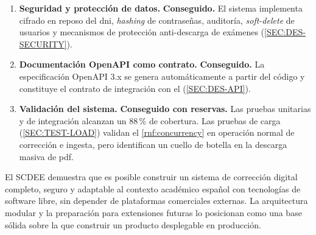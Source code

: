 \begin{enumerate}
  \item \textbf{Seguridad y protección de datos.}
  \label{OBJ:SECURITY-RGPD}
  \textbf{Conseguido.} El sistema implementa cifrado en reposo del
  \acs{dni}, \textit{hashing} de contraseñas, auditoría,
  \textit{soft-delete} de usuarios y mecanismos de protección
  anti-descarga de exámenes (\cref{SEC:DES-SECURITY}).

  \item \textbf{Documentación OpenAPI como contrato.}
  \label{OBJ:OPENAPI-CONTRACT}
  \textbf{Conseguido.} La especificación OpenAPI 3.x se genera
  automáticamente a partir del código y constituye el contrato de
  integración con el  (\cref{SEC:DES-API}).

  \item \textbf{Validación del sistema.}
  \label{OBJ:VALIDATION}
  \textbf{Conseguido con reservas.} Las pruebas unitarias y de
  integración alcanzan un 88\,\% de cobertura. Las pruebas de carga
  (\cref{SEC:TEST-LOAD}) validan el \cref{rnf:concurrency} en operación
  normal de corrección e ingesta, pero identifican un cuello de botella
  en la descarga masiva de \acs{pdf}.

\end{enumerate}

El SCDEE demuestra que es posible construir un sistema de corrección
digital completo, seguro y adaptable al contexto académico español con
tecnologías de software libre, sin depender de plataformas comerciales
externas. La arquitectura modular y la preparación para extensiones
futuras lo posicionan como una base
sólida sobre la que construir un producto desplegable en producción.
